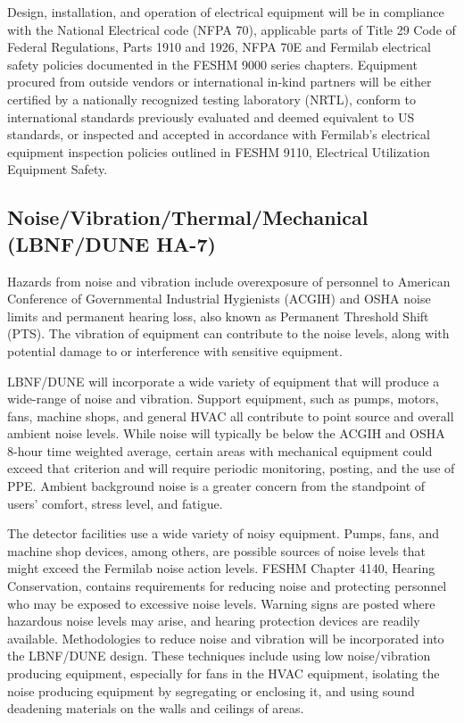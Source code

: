 Design, installation, and operation of electrical equipment will be in
compliance with the National Electrical code (NFPA 70), applicable
parts of Title 29 Code of Federal Regulations, Parts 1910 and 1926,
NFPA 70E and Fermilab electrical safety policies documented in the
FESHM 9000 series chapters. Equipment procured from outside vendors or
international in-kind partners will be either certified by a
nationally recognized testing laboratory (NRTL), conform to
international standards previously evaluated and deemed equivalent to
US standards, or inspected and accepted in accordance with Fermilab's
electrical equipment inspection policies outlined in FESHM 9110,
Electrical Utilization Equipment Safety.


\subsection{Noise/Vibration/Thermal/Mechanical (LBNF/DUNE HA-7)}

Hazards from noise and vibration include overexposure of personnel to
American Conference of Governmental Industrial Hygienists (ACGIH) and
OSHA noise limits and permanent hearing loss, also known as Permanent
Threshold Shift (PTS). The vibration of equipment can contribute to
the noise levels, along with potential damage to or interference with
sensitive equipment.

LBNF/DUNE will incorporate a wide variety of equipment that will
produce a wide-range of noise and vibration. Support equipment, such
as pumps, motors, fans, machine shops, and general HVAC all contribute
to point source and overall ambient noise levels. While noise will
typically be below the ACGIH and OSHA 8-hour time weighted average,
certain areas with mechanical equipment could exceed that criterion
and will require periodic monitoring, posting, and the use of
PPE. Ambient background noise is a greater concern from the standpoint
of users' comfort, stress level, and fatigue.

The detector facilities use a wide variety of noisy equipment. Pumps,
fans, and machine shop devices, among others, are possible sources of
noise levels that might exceed the Fermilab noise action levels. FESHM
Chapter 4140, Hearing Conservation, contains requirements for reducing
noise and protecting personnel who may be exposed to excessive noise
levels. Warning signs are posted where hazardous noise levels may
arise, and hearing protection devices are readily
available. Methodologies to reduce noise and vibration will be
incorporated into the LBNF/DUNE design. These techniques include using
low noise/vibration producing equipment, especially for fans in the
HVAC equipment, isolating the noise producing equipment by segregating
or enclosing it, and using sound deadening materials on the walls and
ceilings of areas.

